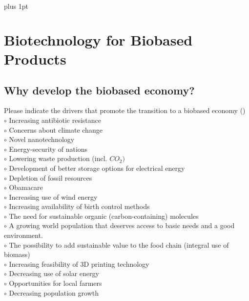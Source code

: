 \documentclass[]{beamer}
\begin{document}
\begin{CJK}{UTF8}{gbsn}
\parskip=1cm plus 1pt
\section{Biotechnology for Biobased Products}
\subsection{ Why develop the biobased economy?}
\setcounter{questions}{0}


\begin{frame}[shrink] {} 
\addtocounter{questions}{1}
\color{blue}
  Please indicate the drivers that promote the transition to a biobased economy
 ({})\\
\color{black}
\setlength{\parindent}{-0.4cm}
{\color{red}$\circ$} Increasing antibiotic resistance  \\
{\color{red}$\circ$}     Concerns about climate change  \\
{\color{red}$\circ$}  Novel nanotechnology   \\
{\color{red}$\circ$}  Energy-security of nations  \\
{\color{red}$\circ$}  Lowering waste production (incl. $CO_{2})$   \\
{\color{red}$\circ$} Development of better storage options for electrical energy  \\
{\color{red}$\circ$}  Depletion of fossil resources   \\
{\color{red}$\circ$} Obamacare  \\
{\color{red}$\circ$} Increasing use of wind energy  \\
{\color{red}$\circ$} Increasing availability of birth control methods  \\
{\color{red}$\circ$}  The need for sustainable organic (carbon-containing) molecules  \\
{\color{red}$\circ$}  A growing world population that deserves access to basic needs and a good environment.  \\
{\color{red}$\circ$}  The possibility to add sustainable value to the food chain (integral use of biomass)  \\
{\color{red}$\circ$} Increasing feasibility of 3D printing technology  \\
{\color{red}$\circ$} Decreasing use of solar energy  \\
{\color{red}$\circ$}  Opportunities for local farmers  \\
{\color{red}$\circ$} Decreasing population growth  \\
\end{frame}



\end{CJK}
\end{document}
